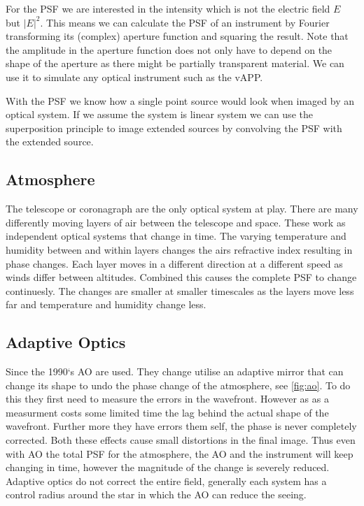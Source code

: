 For the \ac{PSF} we are interested in the intensity which is not the electric field $E$ but ${|E|}^2$. This means we can calculate the \ac{PSF} of an instrument by Fourier transforming its (complex) aperture function and squaring the result. Note that the amplitude in the aperture function does not only have to depend on the shape of the aperture as there might be partially transparent material. We can use it to simulate any optical instrument such as the \acf*{vAPP}.

With the \ac{PSF} we know how a single point source would look when imaged by an optical system. If we assume the system is linear system we can use the superposition principle to image extended sources by convolving the \ac{PSF} with the extended source. 

\subsection{Atmosphere}

The telescope or coronagraph are the only optical system at play. There are many differently moving layers of air between the telescope and space. These work as independent optical systems that change in time. The varying temperature and humidity between and within layers changes the airs refractive index resulting in phase changes. Each layer moves in a different direction at a different speed as winds differ between altitudes. Combined this causes the complete \ac{PSF} to change continuesly. The changes are smaller at smaller timescales as the layers move less far and temperature and humidity change less. 

\subsection{Adaptive Optics}
\label{sec:ao}
Since the 1990‘s \ac{AO} are used. They change utilise an adaptive mirror that can change its shape to undo the phase change of the atmosphere, see \autoref{fig:ao}. To do this they first need to measure the errors in the wavefront. However as as a measurment costs some limited time the lag behind the actual shape of the wavefront. Further more they have errors them self, the phase is never completely corrected. Both these effects cause small distortions in the final image. Thus even with \ac{AO} the total \ac{PSF} for the atmosphere, the \ac{AO} and the instrument will keep changing in time, however the magnitude of the change is severely reduced. Adaptive optics do not correct the entire field, generally each system has a control radius around the star in which the \ac{AO} can reduce the seeing.

